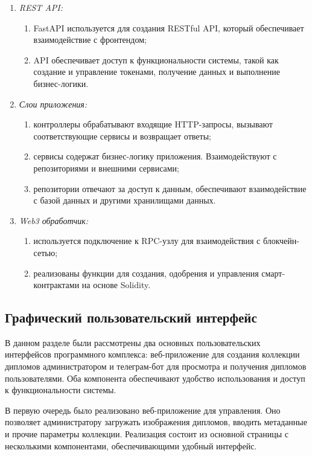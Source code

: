 \begin{enumerate}
    \item \textit{REST API:}
    \begin{enumerate}
        \item FastAPI используется для создания RESTful API, который обеспечивает взаимодействие с фронтендом;
        \item API обеспечивает доступ к функциональности системы, такой как создание и управление токенами, получение данных и выполнение бизнес-логики.
    \end{enumerate}
    \item \textit{Слои приложения:}
    \begin{enumerate}
        \item контроллеры обрабатывают входящие HTTP-запросы, вызывают соответствующие сервисы и возвращает ответы;
        \item сервисы содержат бизнес-логику приложения. Взаимодействуют с репозиториями и внешними сервисами;
        \item репозитории отвечают за доступ к данным, обеспечивают взаимодействие с базой данных и другими хранилищами данных.
    \end{enumerate}
    \item \textit{Web3 обработчик:}
    \begin{enumerate}
        \item используется подключение к RPC-узлу для взаимодействия с блокчейн-сетью;
        \item реализованы функции для создания, одобрения и управления смарт-контрактами на основе Solidity.
    \end{enumerate}
\end{enumerate}

\subsection{Графический пользовательский интерфейс}

В данном разделе были рассмотрены два основных пользовательских интерфейсов программного комплекса: веб-приложение для создания коллекции дипломов администратором и телеграм-бот для просмотра и получения дипломов пользователями. Оба компонента обеспечивают удобство использования и доступ к функциональности системы.

В первую очередь было реализовано веб-приложение для управления. Оно позволяет администратору загружать изображения дипломов, вводить метаданные и прочие параметры коллекции. Реализация состоит из основной страницы с несколькими компонентами, обеспечивающими удобный интерфейс.

